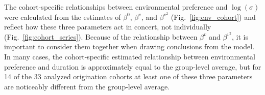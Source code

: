 \documentclass[11pt]{article}
\begin{document}
The cohort-specific relationships between environmental preference and \(\log(\sigma)\) were calculated from the estimates of \(\beta^{0}\), \(\beta^{v}\), and \(\beta^{v^{2}}\) (Fig.~\ref{fig:env_cohort}) and reflect how these three parameters act in concert, not individually (Fig.~\ref{fig:cohort_series}). Because of the relationship between \(\beta^{v}\) and \(\beta^{v^{2}}\), it is important to consider them together when drawing conclusions from the model. In many cases, the cohort-specific estimated relationship between environmental preference and duration is approximately equal to the group-level average, but for 14 of the 33 analyzed origination cohorts at least one of these three parameters are noticeably different from the group-level average. 
\end{document}
